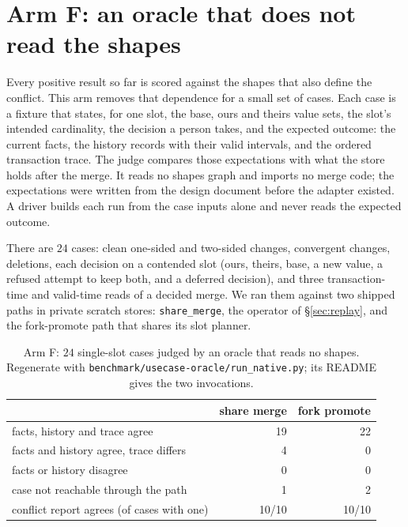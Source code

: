 \section{Arm F: an oracle that does not read the shapes}
\label{sec:oracle}

Every positive result so far is scored against the shapes that also define the
conflict. This arm removes that dependence for a small set of cases. Each case
is a fixture that states, for one slot, the base, ours and theirs value sets,
the slot's intended cardinality, the decision a person takes, and the expected
outcome: the current facts, the history records with their valid intervals, and
the ordered transaction trace. The judge compares those expectations with what
the store holds after the merge. It reads no shapes graph and imports no merge
code; the expectations were written from the design document before the adapter
existed. A driver builds each run from the case inputs alone and never reads
the expected outcome.

There are $24$ cases: clean one-sided and two-sided changes, convergent
changes, deletions, each decision on a contended slot (ours, theirs, base, a new
value, a refused attempt to keep both, and a deferred decision), and three
transaction-time and valid-time reads of a decided merge. We ran them against
two shipped paths in private scratch stores: \texttt{share\_merge}, the operator
of \S\ref{sec:replay}, and the fork-promote path that shares its slot planner.

\begin{table}[t]
\centering
\small
\begin{tabular}{lrr}
\toprule
 & share merge & fork promote \\
\midrule
facts, history and trace agree            & 19 & 22 \\
facts and history agree, trace differs    &  4 &  0 \\
facts or history disagree                 &  0 &  0 \\
case not reachable through the path       &  1 &  2 \\
\midrule
conflict report agrees (of cases with one) & 10/10 & 10/10 \\
\bottomrule
\end{tabular}
\caption{Arm F: $24$ single-slot cases judged by an oracle that reads no
shapes. Regenerate with \texttt{benchmark/usecase-oracle/run\_native.py}; its
README gives the two invocations.}
\label{tab:oracle}
\end{table}

